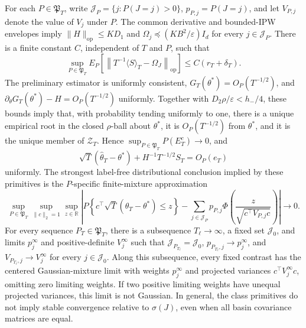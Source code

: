 For each \(P\in\mathfrak P_T\), write \(\mathcal J_P=\{j:P(J=j)>0\}\), \(p_{P,j}=P(J=j)\), and let \(V_{P,j}\) denote the value of \(V_j\) under \(P\). The common derivative and bounded-IPW envelopes imply \(\|H\|_{\mathrm{op}}\le KD_1\) and \(\Omega_j\preceq(KB^2/\varepsilon)I_d\) for every \(j\in\mathcal J_P\). There is a finite constant \(C\), independent of \(T\) and \(P\), such that
\[
 \sup_{P\in\mathfrak P_T}E_P\left[\left\|T^{-1}\langle S\rangle_T-\Omega_J\right\|_{\mathrm{op}}\right]
 \le C(r_T+\delta_T).
\]
The preliminary estimator is uniformly consistent, \(G_T(\theta^*)=O_P(T^{-1/2})\), and \(\partial_\theta G_T(\theta^*)-H=O_P(T^{-1/2})\) uniformly. Together with \(D_2\rho/\varepsilon<h_-/4\), these bounds imply that, with probability tending uniformly to one, there is a unique empirical root in the closed \(\rho\)-ball about \(\theta^*\), it is \(O_P(T^{-1/2})\) from \(\theta^*\), and it is the unique member of \(\mathcal Z_T\). Hence \(\sup_{P\in\mathfrak P_T}P(E_T^c)\to0\), and
\[
 \sqrt T(\widehat\theta_T-\theta^*)+H^{-1}T^{-1/2}S_T=O_P(e_T)
\]
uniformly. The strongest label-free distributional conclusion implied by these primitives is the \(P\)-specific finite-mixture approximation
\[
 \sup_{P\in\mathfrak P_T}\sup_{\|c\|_2=1}\sup_{z\in\mathbb R}
 \left|P\left\{c^\top\sqrt T(\widehat\theta_T-\theta^*)\le z\right\}
 -\sum_{j\in\mathcal J_P}p_{P,j}\Phi\left(\frac{z}{\sqrt{c^\top V_{P,j}c}}\right)\right|\longrightarrow0.
\]
For every sequence \(P_T\in\mathfrak P_T\), there is a subsequence \(T_\ell\to\infty\), a fixed set \(\mathcal J_0\), and limits \(p_j^\infty\) and positive-definite \(V_j^\infty\) such that \(\mathcal J_{P_{T_\ell}}=\mathcal J_0\), \(p_{P_{T_\ell},j}\to p_j^\infty\), and \(V_{P_{T_\ell},j}\to V_j^\infty\) for every \(j\in\mathcal J_0\). Along this subsequence, every fixed contrast has the centered Gaussian-mixture limit with weights \(p_j^\infty\) and projected variances \(c^\top V_j^\infty c\), omitting zero limiting weights. If two positive limiting weights have unequal projected variances, this limit is not Gaussian. In general, the class primitives do not imply stable convergence relative to \(\sigma(J)\), even when all basin covariance matrices are equal.